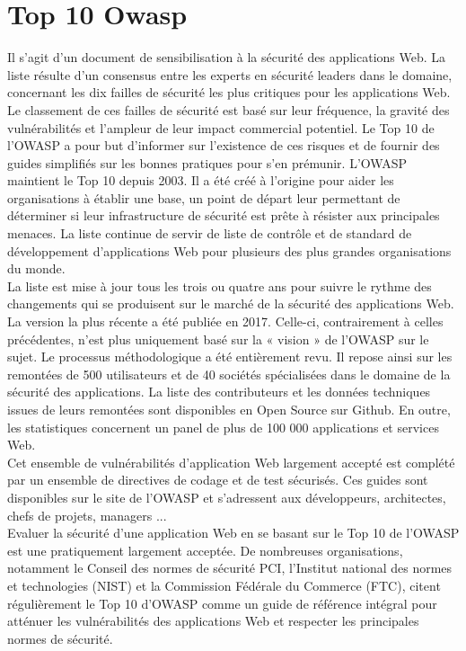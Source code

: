 \section{Top 10 Owasp}
Il s’agit d’un document de sensibilisation à la sécurité des applications Web. La liste résulte d’un consensus entre les experts en sécurité leaders dans le domaine, concernant les dix failles de sécurité les plus critiques pour les applications Web. Le classement de ces failles de sécurité est basé sur leur fréquence, la gravité des vulnérabilités et l'ampleur de leur impact commercial potentiel. Le Top 10 de l’OWASP a pour but d’informer sur l’existence de ces risques et de fournir des guides simplifiés sur les bonnes pratiques pour s’en prémunir. L’OWASP maintient le Top 10 depuis 2003. Il a été créé à l'origine pour aider les organisations à établir une base, un point de départ leur permettant de déterminer si leur infrastructure de sécurité est prête à résister aux principales menaces. La liste continue de servir de liste de contrôle et de standard de développement d'applications Web pour plusieurs des plus grandes organisations du monde. \\
La liste est mise à jour tous les trois ou quatre ans pour suivre le rythme des changements qui se produisent sur le marché de la sécurité des applications Web. La version la plus récente a été publiée en 2017. Celle-ci, contrairement à celles précédentes, n’est plus uniquement basé sur la « vision » de l’OWASP sur le sujet. Le processus méthodologique a été entièrement revu. Il repose ainsi sur les remontées de 500 utilisateurs et de 40 sociétés spécialisées dans le domaine de la sécurité des applications. La liste des contributeurs et les données techniques issues de leurs remontées sont disponibles en Open Source sur Github. En outre, les statistiques concernent un panel de plus de 100 000 applications et services Web.\\
Cet ensemble de vulnérabilités d'application Web largement accepté est complété par un ensemble de directives de codage et de test sécurisés. Ces guides sont disponibles sur le site de l'OWASP et s'adressent aux développeurs, architectes, chefs de projets, managers ... \\
Evaluer la sécurité d’une application Web en se basant sur le Top 10 de l’OWASP est une pratiquement largement acceptée. De nombreuses organisations, notamment le Conseil des normes de sécurité PCI, l'Institut national des normes et technologies (NIST) et la Commission Fédérale du Commerce (FTC), citent régulièrement le Top 10 d'OWASP comme un guide de référence intégral pour atténuer les vulnérabilités des applications Web et respecter les principales normes de sécurité. \\

